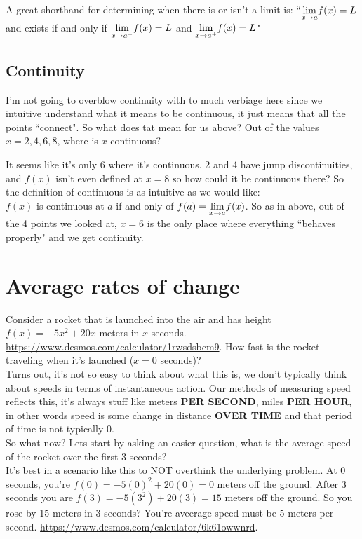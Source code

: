 A great shorthand for determining when there is or isn't a limit is: ``$\displaystyle{ \lim_{x \to a}}f(x)=L$ and exists if and only if $\displaystyle{ \lim_{x \to a^-}}f(x)=L$ and $\displaystyle{ \lim_{x \to a^+}}f(x)=L$"

\subsection{Continuity}

I'm not going to overblow continuity with to much verbiage here since we intuitive understand what it means to be continuous, it just means that all the points ``connect".  So what does tat mean for us above?  Out of the values $x=2,4,6,8$, where is $x$ continuous?

It seems like it's only 6 where it's continuous.  2 and 4 have jump discontinuities, and $f(x)$ isn't even defined at $x=8$ so how could it be continuous there?  So the definition of continuous is as intuitive as we would like:\\

$f(x)$ is continuous at $a$ if and only of $f(a)=\displaystyle{ \lim_{x \to a}} f(x)$.  So as in above, out of the 4 points we looked at, $x=6$ is the only place where everything ``behaves properly" and we get continuity.




\section{Average rates of change}\label{Section:AvgRoC}

Consider a rocket that is launched into the air and has height $f(x)=-5x^2+20x$ meters in $x$ seconds. \url{https://www.desmos.com/calculator/1rwsdsbcm9}. How fast is the rocket traveling when it's launched ($x=0$ seconds)?\\

Turns out, it's not so easy to think about what this is, we don't typically think about speeds in terms of instantaneous action.  Our methods of measuring speed reflects this, it's always stuff like meters \textbf{ PER SECOND}, miles \textbf{ PER HOUR}, in other words speed is some change in distance \textbf{ OVER TIME} and that period of time is not typically 0.\\

So what now?  Lets start by asking an easier question, what is the average speed of the rocket over the first 3 seconds?\\

It's best in a scenario like this to NOT overthink the underlying problem.  At 0 seconds, you're $f(0)=-5(0)^2+20(0)=0$ meters off the ground.  After 3 seconds you are $f(3)=-5(3^2)+20(3)=15$ meters off the ground.  So you rose by 15 meters in 3 seconds?  You're aveerage speed must be 5 meters per second. \url{https://www.desmos.com/calculator/6k61owwnrd}.\\

